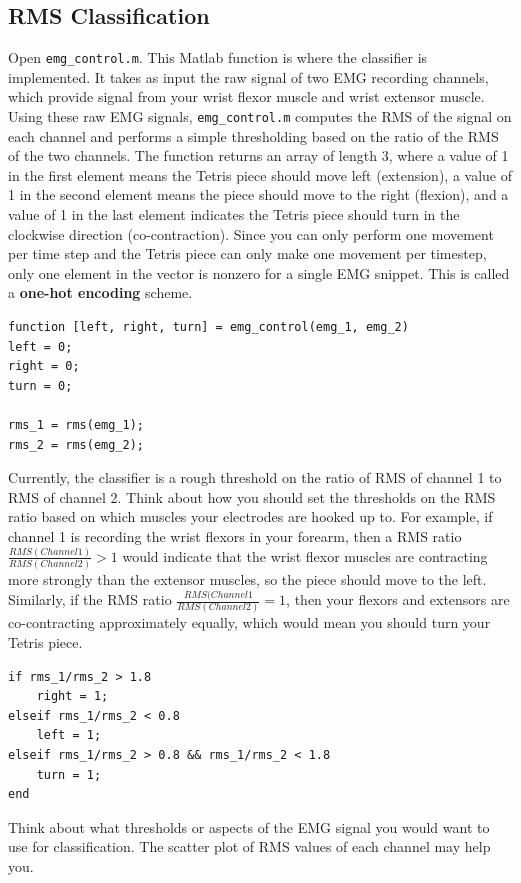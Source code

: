 \documentclass[10pt,oneside,a4paper]{article}
\begin{document}
\subsection{RMS Classification}
Open \texttt{emg\_control.m}. This Matlab function is where the classifier is implemented. It takes as input the raw signal of two EMG recording channels, which provide signal from your wrist flexor muscle and wrist extensor muscle. Using these raw EMG signals, \texttt{emg\_control.m} computes the RMS of the signal on each channel and performs a simple thresholding based on the ratio of the RMS of the two channels. The function returns an array of length 3, where a value of 1 in the first element means the Tetris piece should move left (extension), a value of 1 in the second element means the piece should move to the right (flexion), and a value of 1 in the last element indicates the Tetris piece should turn in the clockwise direction (co-contraction). Since you can only perform one movement per time step and the Tetris piece can only make one movement per timestep, only one element in the vector is nonzero for a single EMG snippet. This is called a \textbf{one-hot encoding} scheme. 
\begin{verbatim}
function [left, right, turn] = emg_control(emg_1, emg_2)
left = 0;
right = 0;
turn = 0;

rms_1 = rms(emg_1);
rms_2 = rms(emg_2);
\end{verbatim}
 
Currently, the classifier is a rough threshold on the ratio of RMS of channel 1 to RMS of channel 2. Think about how you should set the thresholds on the RMS ratio based on which muscles your electrodes are hooked up to. For example, if channel 1 is recording the wrist flexors in your forearm, then a RMS ratio $\frac{RMS(Channel1)}{RMS(Channel2)} > 1$ would indicate that the wrist flexor muscles are contracting more strongly than the extensor muscles, so the piece should move to the left. Similarly, if the RMS ratio $\frac{RMS(Channel1}{RMS(Channel2)} = 1$, then your flexors and extensors are co-contracting approximately equally, which would mean you should turn your Tetris piece. 
\begin{verbatim}
if rms_1/rms_2 > 1.8
    right = 1;
elseif rms_1/rms_2 < 0.8
    left = 1;
elseif rms_1/rms_2 > 0.8 && rms_1/rms_2 < 1.8
    turn = 1;
end
\end{verbatim}
Think about what thresholds or aspects of the EMG signal you would want to use for classification. The scatter plot of RMS values of each channel may help you.
\end{document}
